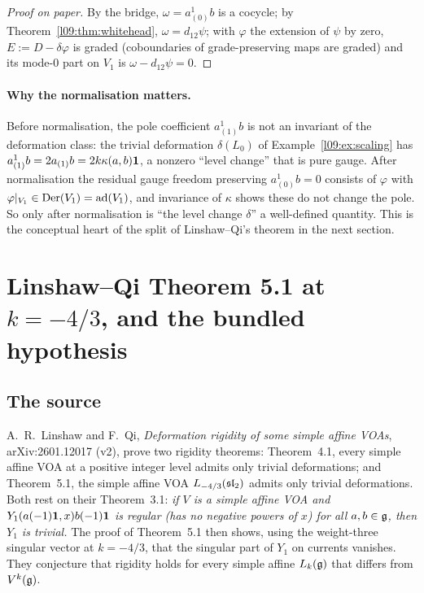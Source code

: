 \begin{proof}[Proof on paper]
By the bridge, $\omega = a^1_{(0)}b$ is a cocycle; by Theorem~\ref{l09:thm:whitehead}, $\omega =
d_{12}\psi$; with $\varphi$ the extension of $\psi$ by zero, $E := D - \delta\varphi$ is graded (coboundaries
of grade-preserving maps are graded) and its mode-$0$ part on $V_1$ is $\omega - d_{12}\psi = 0$.
\end{proof}

\paragraph{Why the normalisation matters.} Before normalisation, the pole coefficient
$a^1_{(1)}b$ is not an invariant of the deformation class: the trivial deformation $\delta(L_0)$ of
Example~\ref{l09:ex:scaling} has $a^1_{(1)}b = 2a_{(1)}b = 2k\kappa(a,b)\mathbf{1}$, a nonzero ``level
change'' that is pure gauge. After normalisation the residual gauge freedom preserving
$a^1_{(0)}b = 0$ consists of $\varphi$ with $\varphi|_{V_1}\in\operatorname{Der}(V_1) = \operatorname{ad}(V_1)$, and invariance of
$\kappa$ shows these do not change the pole. So only after normalisation is ``the level change
$\delta$'' a well-defined quantity. This is the conceptual heart of the split of Linshaw--Qi's
theorem in the next section.

\section{Linshaw--Qi Theorem 5.1 at \texorpdfstring{$k=-4/3$}{k=-4/3}, and the bundled hypothesis}\label{l09:sec:lq}

\subsection{The source}

A.~R.~Linshaw and F.~Qi, \emph{Deformation rigidity of some simple affine VOAs},
arXiv:2601.12017 (v2), prove two rigidity theorems: Theorem~4.1, every simple affine VOA at a
positive integer level admits only trivial deformations; and Theorem~5.1, the simple affine VOA
$L_{-4/3}(\mathfrak{sl}_2)$ admits only trivial deformations. Both rest on their Theorem~3.1:
\emph{if $V$ is a simple affine VOA and $Y_1(a(-1)\mathbf{1},x)b(-1)\mathbf{1}$ is regular (has no negative
powers of $x$) for all $a,b\in\mathfrak{g}$, then $Y_1$ is trivial.} The proof of Theorem~5.1 then shows,
using the weight-three singular vector at $k=-4/3$, that the singular part of $Y_1$ on currents
vanishes. They conjecture that rigidity holds for every simple affine $L_k(\mathfrak{g})$ that differs
from $V^k(\mathfrak{g})$.

